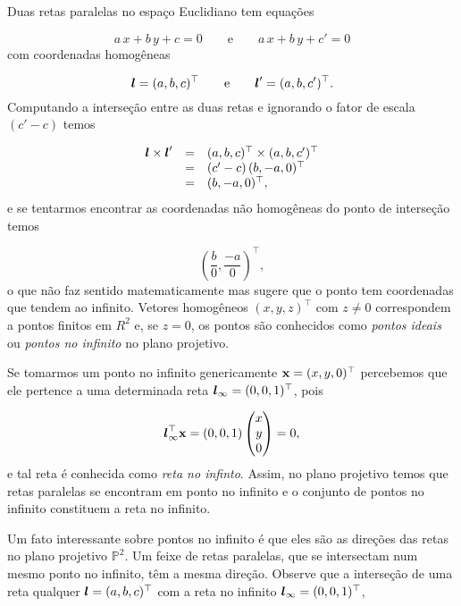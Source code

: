 
Duas retas paralelas no espaço Euclidiano tem equações

\begin{equation*}
a\,x+b\,y+c=0\qquad\text{e}\qquad a\,x+b\,y+c'=0
\end{equation*}
com coordenadas homogêneas

\begin{equation*}
\boldsymbol{l}=(a,b,c)^\top\qquad\text{e}\qquad\boldsymbol{l}'=(a,b,c')^\top.
\end{equation*}
Computando a interseção entre as duas retas e ignorando o fator de escala $(c'-c)$ temos

\begin{equation*}
\begin{array}{rcl}
\boldsymbol{l}\times\boldsymbol{l}'&=&(a,b,c)^\top\times(a,b,c')^\top\\
&=&(c'-c)\,(b,-a,0)^\top\\
&=&(b,-a,0)^\top,
\end{array}
\end{equation*}
e se tentarmos encontrar as coordenadas não homogêneas do ponto de interseção temos

\begin{equation*}
\left(\frac{b}{0},\frac{-a}{0}\right)^\top,
\end{equation*}
o que não faz sentido matematicamente mas sugere que o ponto tem coordenadas que tendem ao infinito. Vetores homogêneos $(x,y,z)^\top$ com $z\neq0$ correspondem a pontos finitos em $R^2$ e, se $z=0$, os pontos são conhecidos como \textit{pontos ideais} ou \textit{pontos no infinito} no plano projetivo.

Se tomarmos um ponto no infinito genericamente $\mathbf{x}=(x,y,0)^\top$ percebemos que ele pertence a uma determinada reta $\boldsymbol{l}_\infty=(0,0,1)^\top$, pois

\begin{equation*}
\boldsymbol{l}_\infty^\top \mathbf{x}=(0,0,1)
\begin{pmatrix}
x\\
y\\
0
\end{pmatrix}
=0,
\end{equation*} 
e tal reta é conhecida como \textit{reta no infinto}. Assim, no plano projetivo temos que retas paralelas se encontram em ponto no infinito e o conjunto de pontos no infinito constituem a reta no infinito.

Um fato interessante sobre pontos no infinito é que eles são as direções das retas no plano projetivo $\mathbb{P}^2$. Um feixe de retas paralelas, que se intersectam num mesmo ponto no infinito, têm a mesma direção. Observe que a interseção de uma reta qualquer $\boldsymbol{l}=(a,b,c)^\top$ com a reta no infinito $\boldsymbol{l}_\infty=(0,0,1)^\top$,

